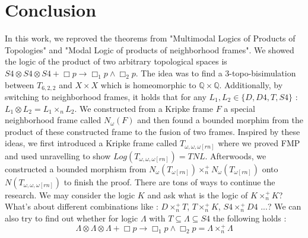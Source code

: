 \documentclass[12pt, a4paper]{scrartcl}
\begin{document}
\section{Conclusion}
    In this work, we reproved the theorems from "Multimodal Logics of Products of Topologies"
    and "Modal Logic of products of neighborhood frames". We showed the logic of the product
    of two arbitrary topological spaces is $S4 \otimes S4 \otimes S4 + \Box p \rightarrow \Box_1 p \land \Box_2 p$.
    The idea was to find a 3-topo-bisimulation between $T_{6,2,2}$ and $X \times X$ which is homeomorphic to $\mathbb{Q} \times \mathbb{Q}$.
    Additionally, by switching to neighborhood frames, it holds that for any $L_1, L_2 \in \{D,D4,T,S4\}$ :
    $L_1 \otimes L_2 = L_1 \times_n L_2$. We constructed from a Kripke frame $F$ a special neighborhood frame called $N_\omega(F)$ and then found
    a bounded morphim from the product of these constructed frame to the fusion of two frames.
    Inspired by these ideas, we first introduced a Kripke frame called $T_{\omega,\omega,\omega[rn]}$ where we proved FMP and used unravelling to show
    $Log(T_{\omega,\omega,\omega[rn]}) = \mathit{TNL}$. Afterwoods, we constructed a bounded morphism from 
    $N_\omega(T_{\omega[rn]}) \times^+_n N_\omega(T_{\omega[rn]})$ onto  $N(T_{\omega,\omega,\omega[rn]})$ to finish the proof. \newline \newline
    There are tons of ways to continue the research. We may consider the logic $K$ and ask what is the logic of
    $K \times^+_n K$? What's about different combinations like :
    $D \times^+_n T$, $T \times^+_n K$, $S4 \times^+_n D4$ ...? 
    We can also try to find out whether for logic $\Lambda$ with $T \subseteq \Lambda \subseteq S4$ the following holds :
    $$\Lambda \otimes \Lambda \otimes \Lambda + \Box p \rightarrow \Box_1 p \land \Box_2 p = \Lambda \times^+_n \Lambda$$
\end{document}
